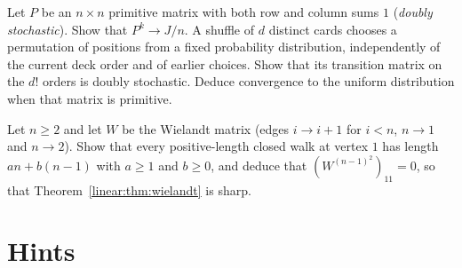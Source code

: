 \begin{exercise}[$\star\star$]\label{linear:ex:doublystoch}
Let $P$ be an $n\times n$ primitive matrix with both row and column sums $1$
(\emph{doubly stochastic}). Show that $P^k\to J/n$.
A shuffle of $d$ distinct cards chooses a permutation of positions from a fixed
probability distribution, independently of the current deck order and of
earlier choices. Show that its transition matrix on the $d!$ orders is doubly
stochastic. Deduce convergence to the uniform distribution when that matrix
is primitive.
\end{exercise}

\begin{exercise}[$\star\star\star$]\label{linear:ex:wielandtsharp}
Let $n\ge2$ and let $W$ be the Wielandt matrix (edges $i\to i+1$ for $i<n$, $n\to1$ and $n\to2$). Show that every positive-length closed walk at vertex $1$
has length $an+b(n-1)$ with $a\ge1$ and $b\ge0$, and deduce that $(W^{(n-1)^2})_{11}=0$, so that Theorem~\ref{linear:thm:wielandt} is
sharp.
\end{exercise}

\section{Hints}


